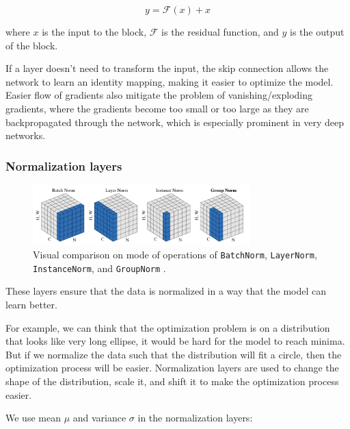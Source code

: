 \begin{equation*}
    y = \mathcal{F} (x) + x
\end{equation*}

where $x$ is the input to the block, $\mathcal{F}$ is the residual function, and $y$ is the output of the block.

If a layer doesn't need to transform the input, the skip connection allows the network to learn an identity mapping, making it easier to optimize the model. Easier flow of gradients also mitigate the problem of vanishing/exploding gradients, where the gradients become too small or too large as they are backpropagated through the network, which is especially prominent in very deep networks.







\subsubsection{Normalization layers}
\label{appendix:blocks_norm}

\begin{figure}
    \centering
    \includegraphics[width=0.75\textwidth]{images/appendix/blocks/norm.png}
    \caption{Visual comparison on mode of operations of \texttt{BatchNorm}, \texttt{LayerNorm}, \texttt{InstanceNorm}, and \texttt{GroupNorm} \cite{wu2018group}.}
    \label{fig:appendix_blocks_norm}
\end{figure}

These layers ensure that the data is normalized in a way that the model can learn better. 

For example, we can think that the optimization problem is on a distribution that looks like very long ellipse, it would be hard for the model to reach minima. But if we normalize the data such that the distribution will fit a circle, then the optimization process will be easier. Normalization layers are used to change the shape of the distribution, scale it, and shift it to make the optimization process easier.

We use mean $\mu$ and variance $\sigma$ in the normalization layers:

